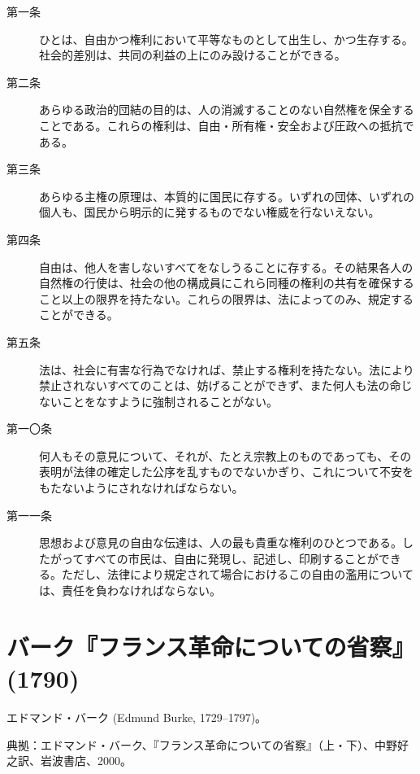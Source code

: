 \begin{description}



 \item[第一条] ひとは、自由かつ権利において平等なものとして出生し、かつ生存する。社会的差別は、共同の利益の上にのみ設けることができる。 

 \item[第二条] あらゆる政治的団結の目的は、人の消滅することのない自然権を保全することである。これらの権利は、自由・所有権・安全および圧政への抵抗である。

 \item[第三条] あらゆる主権の原理は、本質的に国民に存する。いずれの団体、いずれの個人も、国民から明示的に発するものでない権威を行ないえない。

 \item[第四条]自由は、他人を害しないすべてをなしうることに存する。その結果各人の自然権の行使は、社会の他の構成員にこれら同種の権利の共有を確保すること以上の限界を持たない。これらの限界は、法によってのみ、規定することができる。
 
 \item[第五条]法は、社会に有害な行為でなければ、禁止する権利を持たない。法により禁止されないすべてのことは、妨げることができず、また何人も法の命じないことをなすように強制されることがない。
 
 \item[第一〇条] 何人もその意見について、それが、たとえ宗教上のものであっても、その表明が法律の確定した公序を乱すものでないかぎり、これについて不安をもたないようにされなければならない。

 
 \item[第一一条] 思想および意見の自由な伝達は、人の最も貴重な権利のひとつである。したがってすべての市民は、自由に発現し、記述し、印刷することができる。ただし、法律により規定されて場合におけるこの自由の濫用については、責任を負わなければならない。


 \end{description}
 

\section{バーク『フランス革命についての省察』(1790)}

エドマンド・バーク (Edmund Burke, 1729--1797)。

典拠：エドマンド・バーク、『フランス革命についての省察』（上・下）、中野好之訳、岩波書店、2000。


\subsection{}



